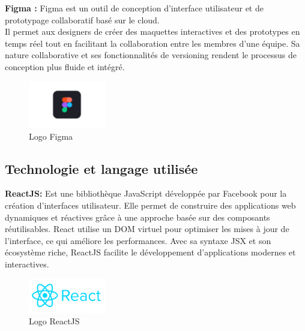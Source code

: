 {\bf{Figma :}}
Figma est un outil de conception d'interface utilisateur et de prototypage collaboratif basé sur le cloud.
\\
Il permet aux designers de créer des maquettes interactives et des prototypes en temps réel tout en facilitant la collaboration entre les membres d'une équipe.
 Sa nature collaborative et ses fonctionnalités de versioning rendent le processus de conception plus fluide et intégré.
 \begin{figure}[H]%
    \center%
    \includegraphics[width=0.3\textwidth]{pages/images/figma-1698087967030-2x.jpg}
    \caption{ Logo Figma }\label{fig:test}%
  \end{figure}





\subsection{Technologie et langage utilisée }
 {\bf{ ReactJS:}}
Est une bibliothèque JavaScript développée par Facebook pour la création d'interfaces utilisateur. Elle permet de construire des applications web dynamiques et réactives grâce à une approche basée sur des composants réutilisables. React utilise un DOM virtuel pour optimiser les mises à jour de l'interface, ce qui améliore les performances. Avec sa syntaxe JSX et son écosystème riche, ReactJS facilite le développement d'applications modernes et interactives.
 \begin{figure}[H]%
    \center%
    \includegraphics[width=0.3\textwidth]{pages/images/react.png}
    \caption{ Logo ReactJS}\label{fig:test}%
  \end{figure}

